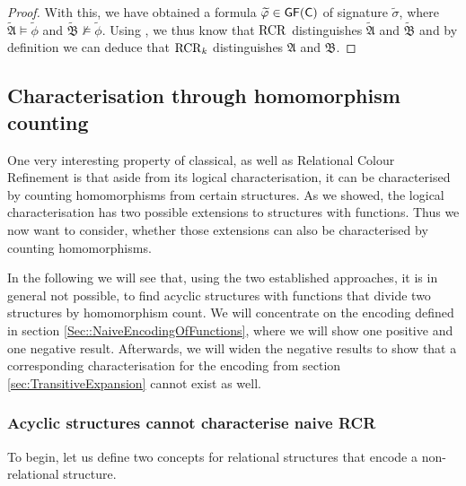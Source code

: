 \begin{proof}
	With this, we have obtained a formula $\widetilde{\varphi}\in\mathsf{GF}(\mathsf{C})$ of signature $\widetilde{\sigma}$, where $\widetilde{\mathfrak A}\models \widetilde{\phi}$ and $\widetilde{\mathfrak B}\not\models \widetilde{\phi}$.
	Using \cite{scheidt2025ColorRefinement}, we thus know that $\operatorname{RCR}$ distinguishes $\widetilde{\mathfrak A}$ and $\widetilde{\mathfrak B}$ and by definition we can deduce that $\operatorname{RCR}_k$ distinguishes $\mathfrak A$ and $\mathfrak B$.
\end{proof}



\subsection{Characterisation through homomorphism counting}

One very interesting property of classical, as well as Relational Colour Refinement is that aside from its logical characterisation, it can be characterised by counting homomorphisms from certain structures.
As we showed, the logical characterisation has two possible extensions to structures with functions.
Thus we now want to consider, whether those extensions can also be characterised by counting homomorphisms.

In the following we will see that, using the two established approaches, it is in general not possible, to find acyclic structures with functions that divide two structures by homomorphism count.
We will concentrate on the encoding defined in section \ref{Sec::NaiveEncodingOfFunctions}, where we will show one positive and one negative result.
Afterwards, we will widen the negative results to show that a corresponding characterisation for the encoding from section \ref{sec:TransitiveExpansion} cannot exist as well.

\subsubsection{Acyclic structures cannot characterise naive RCR}

To begin, let us define two concepts for relational structures that encode a non-relational structure.


